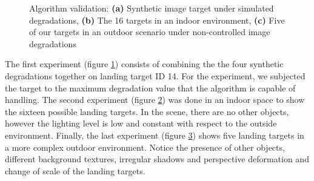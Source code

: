 \begin{figure}[h!]
\centering
\begin{subfigure}[t]{\textwidth+20pt\relax}
    \caption{} \label{fig:synthetic_result}
\end{subfigure}\hfill
\begin{subfigure}[t]{0.315\textwidth}
    \caption{} \label{fig:indoor_result}
\end{subfigure}\hfill
\begin{subfigure}[t]{0.315\textwidth}
    \caption{}  \label{fig:outdoor_result}
\end{subfigure}
\caption{Algorithm validation: \textbf{(a)} Synthetic image target under simulated degradations, \textbf{(b)} The 16 targets in an indoor environment, \textbf{(c)} Five of our targets in an outdoor scenario under non-controlled image degradations}\label{fig:validation}
\end{figure}

The first experiment (figure \ref{fig:synthetic_result}) consists of combining the the four synthetic degradations together on landing target ID 14. For the experiment, we subjected the target to the maximum degradation value that the algorithm is capable of handling. The second experiment (figure \ref{fig:indoor_result}) was done in an indoor space to show the sixteen possible landing targets. In the scene, there are no other objects, however the lighting level is low and constant with respect to the outside environment. Finally, the last experiment (figure \ref{fig:outdoor_result}) shows five landing targets in a more complex outdoor environment. Notice the presence of other objects, different background textures,  irregular shadows and perspective deformation and change of scale of the landing targets. 

